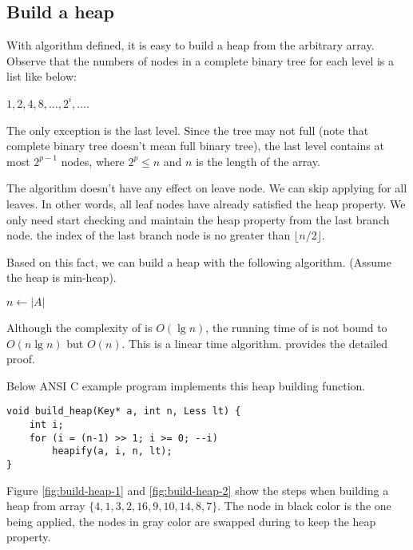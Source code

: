 \documentclass{article}
\begin{document}
\subsection{Build a heap}

With  algorithm defined, it is easy to build a heap from the arbitrary
array. Observe that the numbers of nodes in a complete binary tree
for each level is a list like below:

$1, 2, 4, 8, ..., 2^i, ...$.

The only exception is the last level. Since the tree may not full
(note that complete binary tree doesn't mean full binary tree), the
last level contains at most $2^{p-1}$ nodes, where $2^p \leq n$ and $n$
is the length of the array.

The  algorithm doesn't have any effect on leave node.
We can skip applying  for all leaves. In other words,
all leaf nodes have already satisfied the heap property. We only need
start checking and maintain the heap property from the last branch node.
the index of the last branch node is no greater than $\lfloor n/2 \rfloor$.

Based on this fact, we can build a heap with the following algorithm.
(Assume the heap is min-heap).

\begin{algorithmic}[1]
  \State $n \gets |A|$
    \State {}
  \EndFor
\EndFunction
\end{algorithmic}

Although the complexity of  is $O(\lg n)$, the running time
of  is not bound to $O(n \lg n)$ but $O(n)$. This
is a linear time algorithm. \cite{CLRS} provides the detailed proof.

Below ANSI C example program implements this heap building function.

\lstset{language=C}
\begin{lstlisting}
void build_heap(Key* a, int n, Less lt) {
    int i;
    for (i = (n-1) >> 1; i >= 0; --i)
        heapify(a, i, n, lt);
}
\end{lstlisting}

Figure \ref{fig:build-heap-1} and \ref{fig:build-heap-2}
show the steps when building a heap from
array $\{4, 1, 3, 2, 16, 9, 10, 14, 8, 7\}$.
The node in black color is the one  being
applied, the nodes in gray color are swapped during
to keep the heap property.
\end{document}
